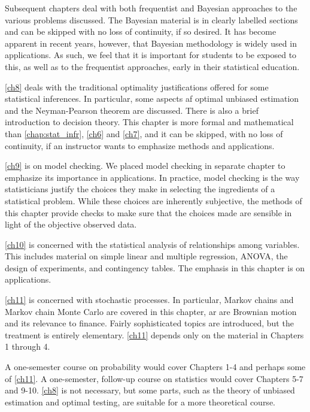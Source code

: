 Subsequent chapters deal with both frequentist and Bayesian approaches to the various problems discussed. The Bayesian material is in clearly labelled sections and can be skipped with no loss of continuity, if so desired. It has become apparent in recent years, however, that Bayesian methodology is widely used in applications. As such, we feel that it is important for students to be exposed to this, as well as to the frequentist approaches, early in their statistical education.

\autoref{ch8} deals with the traditional optimality justifications offered  for some statistical inferences. In particular, some aspects af optimal unbiased estimation and the Neyman-Pearson theorem are discussed. There is also a brief introduction to decision theory. This chapter is more formal and mathematical than  \autoref{chap:stat_infr}, \autoref{ch6} and \autoref{ch7}, and it can be skipped, with no loss of continuity, if an instructor wants to emphasize methods and applications.

\autoref{ch9} is on model checking. We placed model checking in separate chapter to emphasize its importance in applications. In practice, model checking is the way statisticians justify the choices they make in selecting the ingredients of a statistical problem. While these choices are inherently subjective, the methods of this chapter provide checks to make sure that the choices made are sensible in light of the objective observed data.

\autoref{ch10} is concerned with the statistical analysis of relationships among variables. This includes material on simple linear and multiple regression, ANOVA, the design of experiments, and contingency tables. The emphasis in this chapter is on applications.

\autoref{ch11} is concerned with stochastic processes. In particular, Markov chains and Markov chain Monte Carlo are covered in this chapter, ar are Brownian motion and its relevance to finance. Fairly sophisticated topics are introduced, but the treatment is entirely elementary. \autoref{ch11} depends only on the material in Chapters 1 through 4.

A one-semester course on probability would cover Chapters 1-4 and perhaps some of \autoref{ch11}. A one-semester, follow-up course on statistics would cover Chapters 5-7 and 9-10. \autoref{ch8} is not necessary, but some parts, such as the theory of unbiased estimation and optimal testing, are suitable for a more theoretical course.

